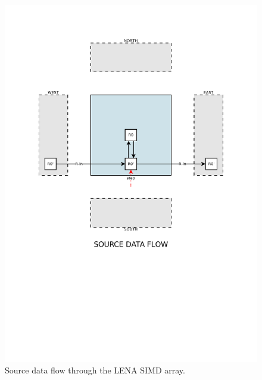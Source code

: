 \begin{figure}[h]
  \centering
  \includegraphics[width=\linewidth,clip,trim=0 0 0 0]
                  {fig/fpga/fpga-simd-s-reg.pdf}
  \caption[Source Data Flow.]{Source data flow through the \ac{LENA}
    \ac{SIMD} array.}
  \label{fig:fpga-simd-s-reg}
\end{figure}
